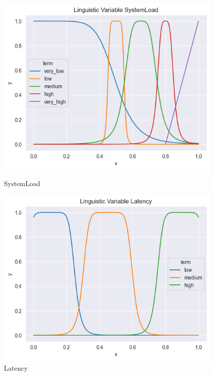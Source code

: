 \documentclass[titlepage]{article}
\begin{document}
\begin{figure}[H]
    \centering
    \begin{minipage}{0.32\textwidth}
        \centering
        \includegraphics[width=\textwidth]{../images/bell_v9/SystemLoad}
        \caption{SystemLoad}
        \label{fig:bellv9_system_load}
    \end{minipage}
    \hfill
    \begin{minipage}{0.32\textwidth}
        \centering
        \includegraphics[width=\textwidth]{../images/bell_v9/Latency}
        \caption{Latency}
        \label{fig:bellv9_latency}
    \end{minipage}

\end{figure}
\end{document}
